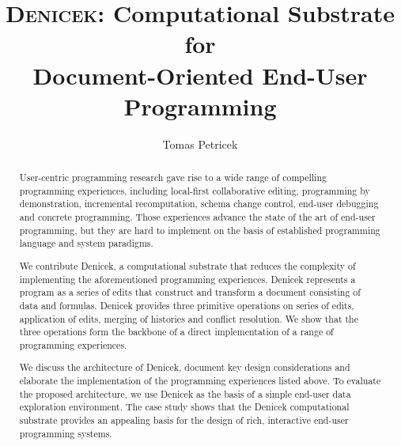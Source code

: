 \documentclass[sigconf,anonymous,screen]{acmart}
\begin{document}
\title[Denicek: Computational Substrate for Document-Oriented End-User
  Programming]{{\scshape Denicek}: Computational Substrate for\\ Document-Oriented End-User Programming}

\author{Tomas Petricek}

\begin{abstract}
User-centric programming research gave rise to a wide range of compelling programming experiences,
including local-first collaborative editing, programming by demonstration, incremental
recomputation, schema change control, end-user debugging and concrete programming.
Those experiences advance the state of the art of end-user programming, but they are hard to
implement on the basis of established programming language and system paradigms.

We contribute Denicek, a computational substrate that reduces the complexity of
implementing the aforementioned programming experiences. Denicek represents a program as a series of edits
that construct and transform a document consisting of data and formulas. Denicek provides three
primitive operations on series of edits, application of edits, merging of histories and conflict resolution.
We show that the three operations form the backbone of a direct implementation of a range of
programming experiences.

We discuss the architecture of Denicek, document key design considerations and elaborate
the implementation of the programming experiences listed above. To evaluate the proposed
architecture, we use Denicek as the basis of a simple end-user data exploration environment.
The case study shows that the Denicek computational substrate provides an appealing basis for the
design of rich, interactive end-user programming systems.
\end{abstract}


\maketitle
\end{document}
